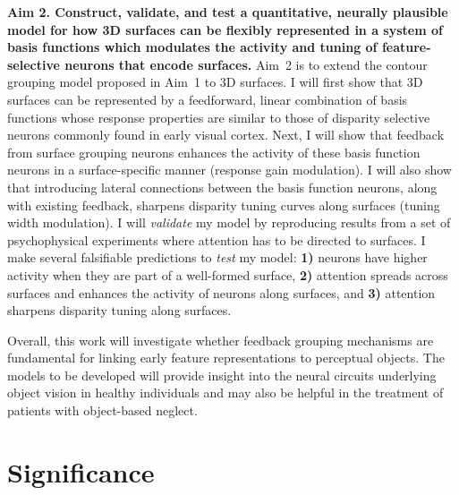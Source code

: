\documentclass[11pt,notitlepage]{article}
\begin{document}
\bigskip

\textbf{\large Aim 2. Construct, validate, and test a quantitative,
  neurally plausible 
  model for how 3D surfaces can be flexibly represented in a
  system of basis functions which modulates the activity and tuning of
  feature-selective neurons that encode surfaces.}  Aim~2 is to
extend the contour grouping model proposed in Aim~1 to 3D surfaces. I
will first show that 
3D surfaces can be represented by a feedforward, linear combination of
basis functions whose response properties are similar to those of disparity selective
neurons commonly found in early visual cortex. 
%
Next, I will
show that feedback from surface grouping neurons enhances the activity
of these basis function neurons in a 
surface-specific 
manner (response gain modulation). I will also show that introducing lateral
connections between the basis function neurons, along with existing
feedback, sharpens disparity tuning curves along surfaces (tuning
width modulation). I will {\em validate} my model by reproducing
results from a set of psychophysical experiments where attention has to be
directed to surfaces. I make several falsifiable predictions to \textit{test}
my model:
\textbf{1)} neurons have higher activity when they are part of a
well-formed surface, \textbf{2)} attention spreads across surfaces and
enhances the activity of neurons along surfaces, and \textbf{3)}
attention sharpens disparity tuning along surfaces.  \bigskip

Overall, this work will investigate whether feedback
    grouping mechanisms are fundamental for linking early feature
    representations to perceptual objects. The models to be
developed will
provide insight into the neural circuits underlying object vision
in healthy individuals and may
also be helpful in the treatment of patients with object-based
neglect.

\setcounter{section}{0} %
\clearpage

\section{Significance}
\end{document}
